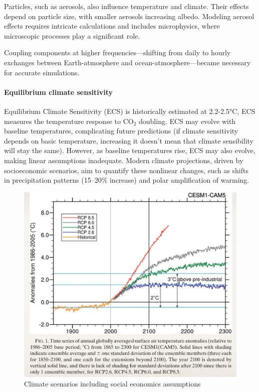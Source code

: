 Particles, such as aerosols, also influence temperature and climate. Their effects depend on particle size, with smaller aerosols increasing albedo. Modeling aerosol effects requires intricate calculations and includes microphysics, where microscopic processes play a significant role.

Coupling components at higher frequencies—shifting from daily to hourly exchanges between Earth-atmosphere and ocean-atmosphere—became necessary for accurate simulations.

\paragraph{Equilibrium climate sensitivity} Equilibrium Climate Sensitivity (ECS) is historically estimated at 2.2-2.5°C, ECS measures the temperature response to CO$_2$ doubling. ECS may evolve with baseline temperatures, complicating future predictions (if climate sensitivity depends on basic temperature, increasing it doesn't mean that climate sensibility will stay the same). However, as baseline temperatures rise, ECS may also evolve, making linear assumptions inadequate. Modern climate projections, driven by socioeconomic scenarios, aim to quantify these nonlinear changes, such as shifts in precipitation patterns (15–20\% increase) and polar amplification of warming.
\begin{figure}[htpb]
	\centering
	\includegraphics[width=0.5\linewidth]{uploads/climatescenarios.png}
	\caption{Climate scenarios including social economics assumptions}
	\label{fig:clim scenarios}
\end{figure}
